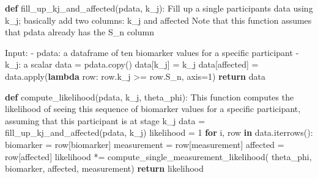 \documentclass[
  letterpaper,
  DIV=11,
  numbers=noendperiod]{scrreprt}
\newenvironment{Shaded}{\begin{snugshade}}{\end{snugshade}}
\newcommand{\BuiltInTok}[1]{\textcolor[rgb]{0.00,0.23,0.31}{#1}}
\newcommand{\CommentTok}[1]{\textcolor[rgb]{0.37,0.37,0.37}{#1}}
\newcommand{\ControlFlowTok}[1]{\textcolor[rgb]{0.00,0.23,0.31}{\textbf{#1}}}
\newcommand{\DecValTok}[1]{\textcolor[rgb]{0.68,0.00,0.00}{#1}}
\newcommand{\KeywordTok}[1]{\textcolor[rgb]{0.00,0.23,0.31}{\textbf{#1}}}
\newcommand{\NormalTok}[1]{\textcolor[rgb]{0.00,0.23,0.31}{#1}}
\newcommand{\OperatorTok}[1]{\textcolor[rgb]{0.37,0.37,0.37}{#1}}
\newcommand{\StringTok}[1]{\textcolor[rgb]{0.13,0.47,0.30}{#1}}
\begin{document}
\begin{Shaded}
\begin{Highlighting}[]
\KeywordTok{def}\NormalTok{ fill\_up\_kj\_and\_affected(pdata, k\_j):}
    \CommentTok{\textquotesingle{}\textquotesingle{}\textquotesingle{}Fill up a single participant\textquotesingle{}s data using k\_j; basically add two columns: }
\CommentTok{    k\_j and affected}
\CommentTok{    Note that this function assumes that pdata already has the S\_n column}

\CommentTok{    Input:}
\CommentTok{    {-} pdata: a dataframe of ten biomarker values for a specific participant }
\CommentTok{    {-} k\_j: a scalar}
\CommentTok{    \textquotesingle{}\textquotesingle{}\textquotesingle{}}
\NormalTok{    data }\OperatorTok{=}\NormalTok{ pdata.copy()}
\NormalTok{    data[}\StringTok{\textquotesingle{}k\_j\textquotesingle{}}\NormalTok{] }\OperatorTok{=}\NormalTok{ k\_j}
\NormalTok{    data[}\StringTok{\textquotesingle{}affected\textquotesingle{}}\NormalTok{] }\OperatorTok{=}\NormalTok{ data.}\BuiltInTok{apply}\NormalTok{(}\KeywordTok{lambda}\NormalTok{ row: row.k\_j }\OperatorTok{\textgreater{}=}\NormalTok{ row.S\_n, axis}\OperatorTok{=}\DecValTok{1}\NormalTok{)}
    \ControlFlowTok{return}\NormalTok{ data}

\KeywordTok{def}\NormalTok{ compute\_likelihood(pdata, k\_j, theta\_phi):}
    \CommentTok{\textquotesingle{}\textquotesingle{}\textquotesingle{}}
\CommentTok{    This function computes the likelihood of seeing this sequence of biomarker values }
\CommentTok{    for a specific participant, assuming that this participant is at stage k\_j}
\CommentTok{    \textquotesingle{}\textquotesingle{}\textquotesingle{}}
\NormalTok{    data }\OperatorTok{=}\NormalTok{ fill\_up\_kj\_and\_affected(pdata, k\_j)}
\NormalTok{    likelihood }\OperatorTok{=} \DecValTok{1}
    \ControlFlowTok{for}\NormalTok{ i, row }\KeywordTok{in}\NormalTok{ data.iterrows():}
\NormalTok{        biomarker }\OperatorTok{=}\NormalTok{ row[}\StringTok{\textquotesingle{}biomarker\textquotesingle{}}\NormalTok{]}
\NormalTok{        measurement }\OperatorTok{=}\NormalTok{ row[}\StringTok{\textquotesingle{}measurement\textquotesingle{}}\NormalTok{]}
\NormalTok{        affected }\OperatorTok{=}\NormalTok{ row[}\StringTok{\textquotesingle{}affected\textquotesingle{}}\NormalTok{]}
\NormalTok{        likelihood }\OperatorTok{*=}\NormalTok{ compute\_single\_measurement\_likelihood(}
\NormalTok{            theta\_phi, biomarker, affected, measurement)}
    \ControlFlowTok{return}\NormalTok{ likelihood}


\end{Highlighting}
\end{Shaded}
\end{document}
